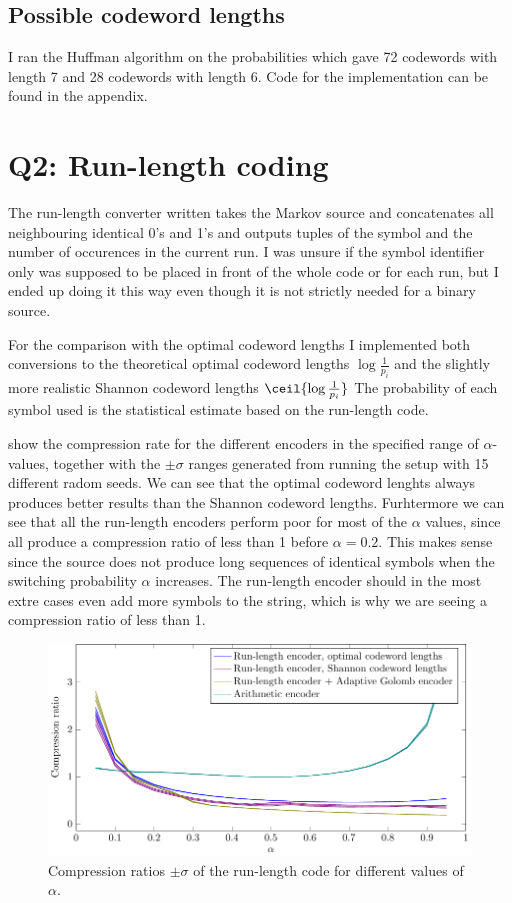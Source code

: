 \documentclass{article}
\begin{document}
\subsection{Possible codeword lengths}
I ran the Huffman algorithm on the probabilities which gave
72 codewords with length 7 
and 28 codewords with length 6.
Code for the implementation can be found in the appendix.

\section{Q2: Run-length coding}
The run-length converter written takes the Markov source and concatenates all neighbouring
identical 0's and 1's and outputs tuples of the symbol and the number of occurences in the current run.
I was unsure if the symbol identifier only was supposed to be placed in front of the whole code
or for each run,
but I ended up doing it this way even though it is not strictly needed for a binary source.

For the comparison with the optimal codeword lengths 
I implemented both conversions to the theoretical optimal codeword lengths
$\log\frac{1}{p_i}$ and the slightly more realistic Shannon codeword lengths
$\ceil{\log\frac{1}{p_i}}$
The probability of each symbol used is the statistical estimate based on the run-length code.

 show the compression rate for the different encoders
in the specified range of $\alpha$-values,
together with the $\pm\sigma$ ranges generated from running the setup with 15 different radom seeds.
We can see that the optimal codeword lenghts always produces better results than the Shannon codeword lengths.
Furhtermore we can see that all the run-length encoders perform poor for most of the $\alpha$ values,
since all produce a compression ratio of less than 1 before $\alpha = 0.2$.
This makes sense since the source does not produce long sequences of identical symbols
when the switching probability $\alpha$ increases.
The run-length encoder should in the most extre cases even add more symbols to the string,
which is why we are seeing a compression ratio of less than 1.

\begin{figure}[!ht]
  \centering
  \includegraphics{../tikz/compression_optimal/optimal_run_length.pdf}
  \caption{Compression ratios $\pm\sigma$ of the run-length code for different values of $\alpha$.}
  \label{fig:comprratio}
\end{figure}
\end{document}

